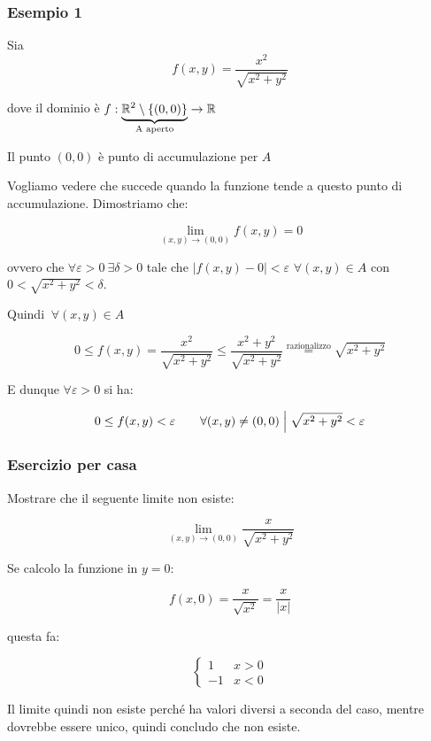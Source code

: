 \subsubsection*{Esempio 1}

Sia
\[
    f(x,y) = \frac{x^{2}}{\sqrt{x^{2}+y^{2}}}
\]

dove il dominio è \(f: \underbrace{\R^{2}\setminus \{(0,0)\}}_\text{A aperto}\rightarrow \R \)

Il punto \((0,0)\) è punto di accumulazione per \(A\)

Vogliamo vedere che succede quando la funzione tende a questo punto di accumulazione. Dimostriamo che:

\[
    \lim_{ (x,y) \to (0,0) } f(x,y) = 0
\]

ovvero che \(\forall \varepsilon >0 ~\exists \delta >0\) tale che \(|f(x,y) -0| < \varepsilon \) \(\forall (x,y) \in A\) con \(0< \sqrt{x^{2}+y^{2}}<\delta \).

Quindi \(~\forall (x,y) \in A\)

\[
    0 \le f(x,y) = \frac{x^{2}}{\sqrt{x^{2}+y^{2}}} \le \frac{x^{2}+y^{2}}{\sqrt{x^{2}+y^{2}}} \overset{\text{razionalizzo}}{=} \sqrt{x^{2}+y^{2}}
\]

E dunque  \(\forall \varepsilon > 0\) si ha:

\[
    0 \le f(x,y) < \varepsilon \qquad \forall (x,y) \neq (0,0) \giventhat[\Big] \sqrt{x^{2}+y^{2}} < \varepsilon
\]

\filbreak{}
\subsubsection*{Esercizio per casa}

Mostrare che il seguente limite non esiste:

\[
    \lim_{ (x,y) \to (0,0) } \frac{x}{\sqrt{x^{2}+y^{2}}}
\]

Se calcolo la funzione in \(y=0\):

\[
    f(x,0) = \frac{x}{\sqrt{x^{2}}}= \frac{x}{|x|}
\]

questa fa:

\begin{equation*}
    \begin{cases}
        1  & x > 0 \\
        -1 & x < 0
    \end{cases}
\end{equation*}

Il limite quindi non esiste perché ha valori diversi a seconda del caso, mentre dovrebbe essere unico, quindi concludo che non esiste.

